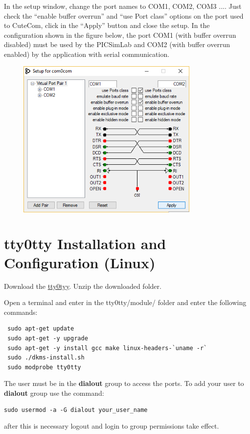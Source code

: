 In the setup window, change the port names to COM1, COM2, COM3 ....
Just check the ``enable buffer overrun'' and ``use Port class'' options on the port used to CuteCom, click in the ``Apply'' button and close the setup.
In the configuration shown in the figure below, the port COM1 (with buffer overrun disabled) must be used by the PICSimLab and COM2 (with buffer overrun enabled) by the application with serial communication.
\begin{figure}[H]
\center
\includegraphics[width=0.8\textwidth]{img/com0com3.png} 
\end{figure} 
 
\section{tty0tty Installation and Configuration (Linux)}
 
Download the \href{https://github.com/lcgamboa/tty0tty/archive/master.zip}{tty0tyy}.
Unzip the downloaded folder.
 
Open a terminal and enter in the tty0tty/module/ folder and enter the following commands:
\begin{verbatim}
 sudo apt-get update
 sudo apt-get -y upgrade
 sudo apt-get -y install gcc make linux-headers-`uname -r` 
 sudo ./dkms-install.sh
 sudo modprobe tty0tty
\end{verbatim}

The user must be in the \textbf{dialout} group to access the ports. 
To add your user to \textbf{dialout} group use the command:
\begin{verbatim}
sudo usermod -a -G dialout your_user_name
\end{verbatim}
after this is necessary logout and login to group permissions take effect.


